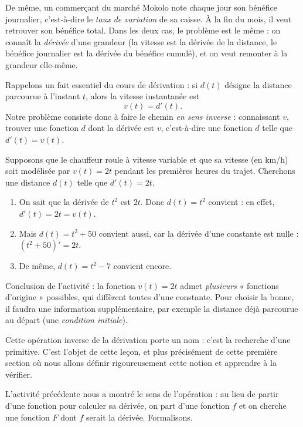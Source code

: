 \documentclass[11pt]{article}
\newcommand{\cle}[1]{{\popxbold\color{popdark}#1}}
\newcounter{popsec}
\newcounter{popsub}
\newcommand{\courssub}[1]{%
  \stepcounter{popsub}%
  \par\vspace{9pt}\noindent{\popxbold\fontsize{11.5}{13}\selectfont\color{popink}{\color{poporange}\thepopsec.\thepopsub}\hspace{6pt}#1}\par\nopagebreak\vspace{4pt}
}
\begin{document}
De même, un commerçant du marché Mokolo note chaque jour son bénéfice journalier, c'est-à-dire le \emph{taux de variation} de sa caisse. À la fin du mois, il veut retrouver son bénéfice total. Dans les deux cas, le problème est le même : on connaît la \emph{dérivée} d'une grandeur (la vitesse est la dérivée de la distance, le bénéfice journalier est la dérivée du bénéfice cumulé), et on veut remonter à la grandeur elle-même.

Rappelons un fait essentiel du cours de dérivation : si $d(t)$ désigne la distance parcourue à l'instant $t$, alors la vitesse instantanée est
\[ v(t) = d'(t). \]
Notre problème consiste donc à faire le chemin \emph{en sens inverse} : connaissant $v$, trouver une fonction $d$ dont la dérivée est $v$, c'est-à-dire une fonction $d$ telle que $d'(t) = v(t)$.

\begin{experience}
Supposons que le chauffeur roule à vitesse variable et que sa vitesse (en km/h) soit modélisée par $v(t) = 2t$ pendant les premières heures du trajet. Cherchons une distance $d(t)$ telle que $d'(t) = 2t$.
\begin{enumerate}
\item On sait que la dérivée de $t^2$ est $2t$. Donc $d(t) = t^2$ convient : en effet, $d'(t) = 2t = v(t)$.
\item Mais $d(t) = t^2 + 50$ convient aussi, car la dérivée d'une constante est nulle : $(t^2 + 50)' = 2t$.
\item De même, $d(t) = t^2 - 7$ convient encore.
\end{enumerate}
Conclusion de l'activité : la fonction $v(t) = 2t$ admet \emph{plusieurs} « fonctions d'origine » possibles, qui diffèrent toutes d'une constante. Pour choisir la bonne, il faudra une information supplémentaire, par exemple la distance déjà parcourue au départ (une \emph{condition initiale}).
\end{experience}

Cette opération inverse de la dérivation porte un nom : c'est la recherche d'une \cle{primitive}. C'est l'objet de cette leçon, et plus précisément de cette première section où nous allons définir rigoureusement cette notion et apprendre à la vérifier.

\courssub{Définition d'une primitive}

L'activité précédente nous a montré le sens de l'opération : au lieu de partir d'une fonction pour calculer sa dérivée, on part d'une fonction $f$ et on cherche une fonction $F$ dont $f$ serait la dérivée. Formalisons.
\end{document}
